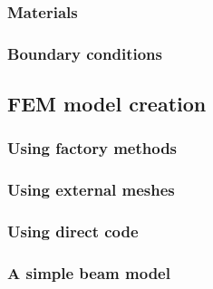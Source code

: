 \subsubsection{Materials}
\label{sec:fem:materials}

\subsubsection{Boundary conditions}

\subsection{FEM model creation}

\subsubsection{Using factory methods}

\subsubsection{Using external meshes}

\subsubsection{Using direct code}

\subsubsection{A simple beam model}

